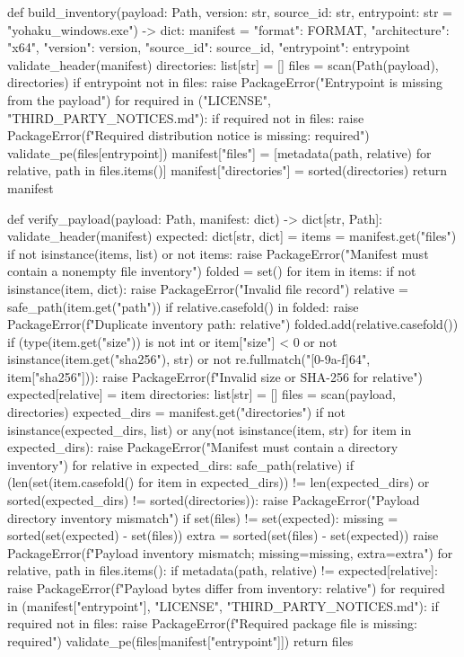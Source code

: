 def build_inventory(payload: Path, version: str, source_id: str,
                    entrypoint: str = "yohaku_windows.exe") -> dict:
    manifest = {"format": FORMAT, "architecture": "x64", "version": version,
                "source_id": source_id, "entrypoint": entrypoint}
    validate_header(manifest)
    directories: list[str] = []
    files = scan(Path(payload), directories)
    if entrypoint not in files:
        raise PackageError("Entrypoint is missing from the payload")
    for required in ("LICENSE", "THIRD_PARTY_NOTICES.md"):
        if required not in files:
            raise PackageError(f"Required distribution notice is missing: {required}")
    validate_pe(files[entrypoint])
    manifest["files"] = [metadata(path, relative) for relative, path in files.items()]
    manifest["directories"] = sorted(directories)
    return manifest


def verify_payload(payload: Path, manifest: dict) -> dict[str, Path]:
    validate_header(manifest)
    expected: dict[str, dict] = {}
    items = manifest.get("files")
    if not isinstance(items, list) or not items:
        raise PackageError("Manifest must contain a nonempty file inventory")
    folded = set()
    for item in items:
        if not isinstance(item, dict):
            raise PackageError("Invalid file record")
        relative = safe_path(item.get("path"))
        if relative.casefold() in folded:
            raise PackageError(f"Duplicate inventory path: {relative}")
        folded.add(relative.casefold())
        if (type(item.get("size")) is not int or item["size"] < 0
                or not isinstance(item.get("sha256"), str)
                or not re.fullmatch("[0-9a-f]{64}", item["sha256"])):
            raise PackageError(f"Invalid size or SHA-256 for {relative}")
        expected[relative] = item
    directories: list[str] = []
    files = scan(payload, directories)
    expected_dirs = manifest.get("directories")
    if not isinstance(expected_dirs, list) or any(not isinstance(item, str) for item in expected_dirs):
        raise PackageError("Manifest must contain a directory inventory")
    for relative in expected_dirs:
        safe_path(relative)
    if (len(set(item.casefold() for item in expected_dirs)) != len(expected_dirs)
            or sorted(expected_dirs) != sorted(directories)):
        raise PackageError("Payload directory inventory mismatch")
    if set(files) != set(expected):
        missing = sorted(set(expected) - set(files))
        extra = sorted(set(files) - set(expected))
        raise PackageError(f"Payload inventory mismatch; missing={missing}, extra={extra}")
    for relative, path in files.items():
        if metadata(path, relative) != expected[relative]:
            raise PackageError(f"Payload bytes differ from inventory: {relative}")
    for required in (manifest["entrypoint"], "LICENSE", "THIRD_PARTY_NOTICES.md"):
        if required not in files:
            raise PackageError(f"Required package file is missing: {required}")
    validate_pe(files[manifest["entrypoint"]])
    return files


